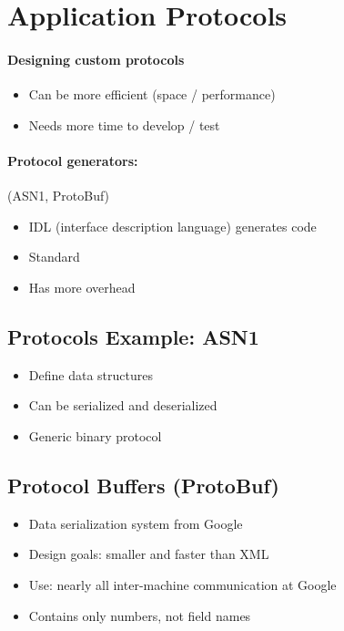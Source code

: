

\section{Application Protocols}

\paragraph{Designing custom protocols}
\begin{itemize}[label={\textcolor{ForestGreen}{+}}]
    \item Can be more efficient (space / performance)
\end{itemize} 
\begin{itemize}[label={\textcolor{red}{--}}]
    \item Needs more time to develop / test
\end{itemize} 

\paragraph{Protocol generators:} (ASN1, ProtoBuf)
\begin{itemize}[label={\textcolor{ForestGreen}{+}}]
    \item IDL (interface description language) generates code
    \item Standard
\end{itemize} 
\begin{itemize}[label={\textcolor{red}{--}}]
    \item Has more overhead
\end{itemize} 

\subsection{Protocols Example: ASN1}
\begin{itemize}
    \item Define data structures
    \item Can be serialized and deserialized
    \item Generic binary protocol
\end{itemize}

\subsection{Protocol Buffers (ProtoBuf)}
\begin{itemize}
    \item Data serialization system from Google
    \item Design goals: smaller and faster than XML
    \item Use: nearly all inter-machine communication at Google
    \item Contains only numbers, not field names
\end{itemize}

